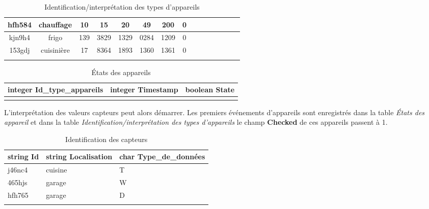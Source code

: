\documentclass[10pt,a4paper]{article}
\begin{document}
\begin{table}[h]
{\begin{tabular}{|c|c|c|c|c|c|c|c|c|c|c|c|c|c|c|}
hfh584 & chauffage & 10 & 15 & 20 & 49 & 200 & 0 &  &  &  &  &  &  &  \\ \hline
kjn9h4 & frigo & 139 & 3829 & 1329 & 0284 & 1209 & 0 &  &  &  &  &  &  &  \\ \hline
153gdj & cuisinière & 17 & 8364 & 1893 & 1360 & 1361 & 0 &  &  &  &  &  &  &  \\ \hline
 &  &  &  &  &  &  &  &  &  &  &  &  &  & 
\end{tabular}
}
\caption{Identification/interprétation des types d'appareils}
\end{table}
\begin{table}[h!]
\centering
    \begin{tabular}{|l|l|l|}
    \hline
    \rowcolor[HTML]{EFEFEF} 
    integer Id\_type\_appareils & integer Timestamp & boolean State \\ \hline                 &                   &              
    \end{tabular}
    \caption{États des appareils}
\end{table}
\newpage
L'interprétation des valeurs capteurs peut alors démarrer. Les premiers événements d'appareils sont enregistrés dans la table \textit{États des appareil} et dans la table \textit{Identification/interprétation des types d'appareils} le champ \textbf{Checked} de ces appareils passent à 1. \\

\begin{table}[h!]
    \centering
    \begin{tabular}{|l|l|l|}
    \hline
    \rowcolor[HTML]{EFEFEF} 
    string Id & string Localisation & char Type\_de\_données \\ \hline
    j46nc4    & cuisine             & T                      \\ \hline
    465hjs    & garage              & W                      \\ \hline
    hfh765    & garage              & D                      \\ \hline
              &                     &                       
    \end{tabular}
    \caption{Identification des capteurs}
\end{table}
\end{document}
